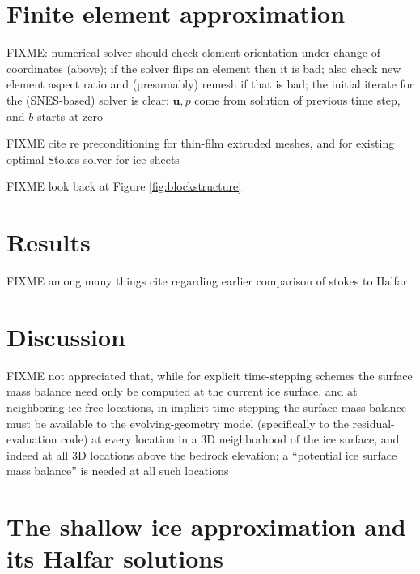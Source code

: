 \documentclass[letterpaper,final,12pt,reqno]{amsart}
\newcommand{\bu}{\mathbf{u}}
\begin{document}
\section{Finite element approximation}  \label{sec:finiteelement}

FIXME: numerical solver should check element orientation under change of coordinates (above); if the solver flips an element then it is bad; also check new element aspect ratio and (presumably) remesh if that is bad; the initial iterate for the (SNES-based) solver is clear: $\bu,p$ come from solution of previous time step, and $b$ starts at zero

FIXME cite \cite{Tuminaroetal2016} re preconditioning for thin-film extruded meshes, and \cite{IsaacStadlerGhattas2015} for existing optimal Stokes solver for ice sheets

FIXME look back at Figure \ref{fig:blockstructure}


\section{Results}

FIXME among many things cite \cite{LeysingerGudmundsson2004} regarding earlier comparison of stokes to Halfar


\section{Discussion}

FIXME not appreciated that, while for explicit time-stepping schemes the surface mass balance need only be computed at the current ice surface, and at neighboring ice-free locations, in implicit time stepping the surface mass balance must be available to the evolving-geometry model (specifically to the residual-evaluation code) at every location in a 3D neighborhood of the ice surface, and indeed at all 3D locations above the bedrock elevation; a ``potential ice surface mass balance'' is needed at all such locations

\appendix
\section{The shallow ice approximation and its Halfar solutions}
\end{document}
